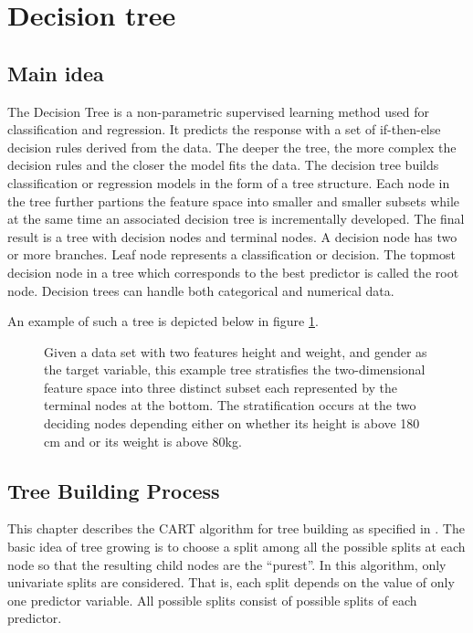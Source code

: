 \section{Decision tree}

\subsection{Main idea}
The Decision Tree is a non-parametric supervised learning method used for classification and regression.
It predicts the response with a set of if-then-else decision rules derived from the data.
The deeper the tree, the more complex the decision rules and the closer the model fits the data.
The decision tree builds classification or regression models in the form of a tree structure. 
Each node in the tree further partions the feature space into smaller and smaller subsets 
while at the same time an associated decision tree is incrementally developed.
The final result is a tree with decision nodes and terminal nodes. 
A decision node has two or more branches.
Leaf node represents a classification or decision. 
The topmost decision node in a tree which corresponds to the best predictor is called the root node.
Decision trees can handle both categorical and numerical data.

An example of such a tree is depicted below in figure \ref{fig:decision_tree_example}.

\begin{figure}[H]
    \captionsetup{format=plain}
    \caption{Given a data set with two features height and weight, and gender as the target variable, 
             this example tree stratisfies the two-dimensional feature space into three distinct subset each 
             represented by the terminal nodes at the bottom.
             The stratification occurs at the two deciding nodes depending either on whether its height is above 180 cm 
             and or its weight  is above 80kg.
             }
    \label{fig:decision_tree_example}
\end{figure}

\subsection{Tree Building Process}
This chapter describes the CART algorithm for tree building as specified in \cite{breiman1984classification}.
The basic idea of tree growing is to choose a split among all the possible splits at each node
so that the resulting child nodes are the “purest”. In this algorithm, only univariate splits are
considered. That is, each split depends on the value of only one predictor variable. All
possible splits consist of possible splits of each predictor.

